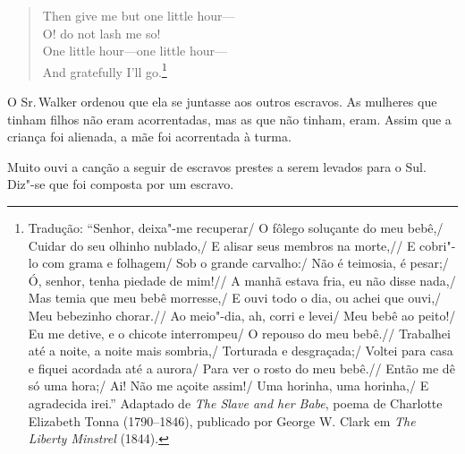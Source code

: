 \begin{verse}
Then give me but one little hour---\\
O! do not lash me so!\\
One little hour---one little hour---\\
And gratefully I'll go.\footnote{Tradução: ``Senhor, deixa"-me recuperar/ O fôlego soluçante do meu bebê,/ Cuidar do seu olhinho nublado,/ E alisar seus membros na morte,// E cobri"-lo com grama e folhagem/ Sob o grande carvalho:/ Não é teimosia, é pesar;/ Ó, senhor, tenha piedade de mim!// A manhã estava fria, eu não disse nada,/ Mas temia que meu bebê morresse,/ E ouvi todo o dia, ou achei que ouvi,/ Meu bebezinho chorar.//
Ao meio"-dia, ah, corri e levei/ Meu bebê ao peito!/ Eu me detive, e o chicote interrompeu/ O repouso do meu bebê.// Trabalhei até a noite, a noite mais sombria,/ Torturada e desgraçada;/ 
Voltei para casa e fiquei acordada até a aurora/ Para ver o rosto do meu bebê.// Então me dê só uma hora;/ Ai! Não me açoite assim!/ Uma horinha, uma horinha,/ E agradecida irei.''
Adaptado de \emph{The Slave and her Babe}, poema de Charlotte Elizabeth Tonna
  (1790--1846), publicado por George W. Clark em \emph{The Liberty
  Minstrel} (1844).}
\end{verse}

O Sr.\,Walker ordenou que ela se juntasse aos outros escravos. As
mulheres que tinham filhos não eram acorrentadas, mas as que não tinham,
eram. Assim que a criança foi alienada, a mãe foi acorrentada à turma.

Muito ouvi a canção a seguir de escravos prestes a serem levados para o
Sul. Diz"-se que foi composta por um escravo.


